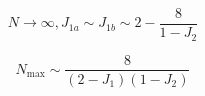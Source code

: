 \documentclass[10pt,aspectratio=43,mathserif,table]{beamer}
\begin{document}
\begin{frame}
    $$
    N\rightarrow \infty , J_{1a}\sim J_{1b}\sim 2-\frac{8}{1-J_2}
    $$

    $$
    N_{\max}\sim \frac{8}{\left( 2-J_1 \right) \left( 1-J_2 \right)}
    $$


\end{frame}

\begin{frame}
    
\end{frame}
\end{document}
